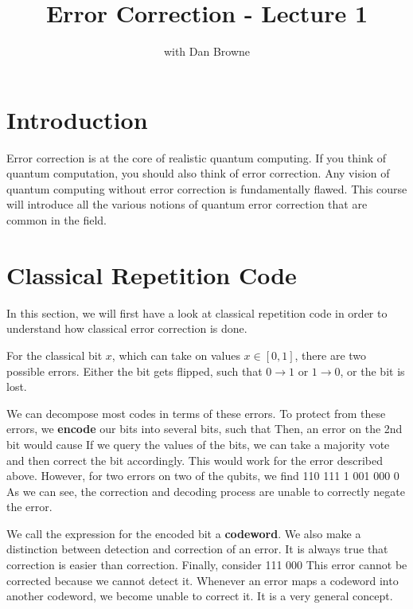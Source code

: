 


\title{Error Correction - Lecture 1}
\author{with Dan Browne}
\maketitle
\tableofcontents

\section{Introduction}
Error correction is at the core of realistic quantum computing. If you think of quantum computation, you should also think of error correction. Any vision of quantum computing without error correction is fundamentally flawed. This course will introduce all the various notions of quantum error correction that are common in the field. 

\section{Classical Repetition Code}
In this section, we will first have a look at classical repetition code in order to understand how classical error correction is done. 

For the classical bit $x$, which can take on values $ x \in [0,1]$, there are two possible errors. Either the bit gets flipped, such that $0 \rightarrow 1 $ or $1 \rightarrow 0$, or the bit is lost. 

We can decompose most codes in terms of these errors. To protect from these errors, we \textbf{encode} our bits into several bits, such that 
 
\eeq
{} 
\eeq
Then, an error on the 2nd bit would cause
 
\eeq
{} 
\eeq
If we query the values of the bits, we can take a majority vote and then correct the bit accordingly. This would work for the error described above. However, for two errors on two of the qubits, we find
  110  111  1
\eeq
{}  001  000  0
\eeq
As we can see, the correction and decoding process are unable to correctly negate the error. 

We call the expression for the encoded bit a \textbf{codeword}. We also make a distinction between detection and correction of an error. It is always true that correction is easier than correction. Finally, consider
  111
\eeq
{}  000
\eeq
This error cannot be corrected because we cannot detect it. Whenever an error maps a codeword into another codeword, we become unable to correct it. It is a very general concept. 

